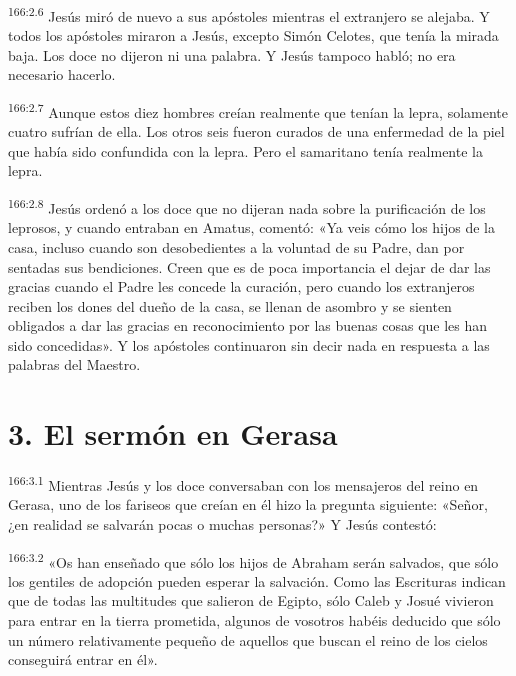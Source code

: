 \par 
\textsuperscript{166:2.6} Jesús miró de nuevo a sus apóstoles mientras el extranjero se alejaba. Y todos los apóstoles miraron a Jesús, excepto Simón Celotes, que tenía la mirada baja. Los doce no dijeron ni una palabra. Y Jesús tampoco habló; no era necesario hacerlo.

\par 
\textsuperscript{166:2.7} Aunque estos diez hombres creían realmente que tenían la lepra, solamente cuatro sufrían de ella. Los otros seis fueron curados de una enfermedad de la piel que había sido confundida con la lepra. Pero el samaritano tenía realmente la lepra.

\par 
\textsuperscript{166:2.8} Jesús ordenó a los doce que no dijeran nada sobre la purificación de los leprosos, y cuando entraban en Amatus, comentó: «Ya veis cómo los hijos de la casa, incluso cuando son desobedientes a la voluntad de su Padre, dan por sentadas sus bendiciones. Creen que es de poca importancia el dejar de dar las gracias cuando el Padre les concede la curación, pero cuando los extranjeros reciben los dones del dueño de la casa, se llenan de asombro y se sienten obligados a dar las gracias en reconocimiento por las buenas cosas que les han sido concedidas». Y los apóstoles continuaron sin decir nada en respuesta a las palabras del Maestro.

\section*{3. El sermón en Gerasa}
\par 
\textsuperscript{166:3.1} Mientras Jesús y los doce conversaban con los mensajeros del reino en Gerasa, uno de los fariseos que creían en él hizo la pregunta siguiente: «Señor, ¿en realidad se salvarán pocas o muchas personas?» Y Jesús contestó:

\par 
\textsuperscript{166:3.2} «Os han enseñado que sólo los hijos de Abraham serán salvados, que sólo los gentiles de adopción pueden esperar la salvación. Como las Escrituras indican que de todas las multitudes que salieron de Egipto, sólo Caleb y Josué vivieron para entrar en la tierra prometida, algunos de vosotros habéis deducido que sólo un número relativamente pequeño de aquellos que buscan el reino de los cielos conseguirá entrar en él».


